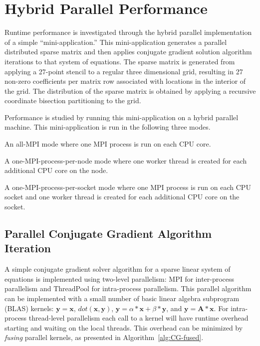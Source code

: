 \section{Hybrid Parallel Performance}

Runtime performance is investigated through the hybrid parallel implementation of a simple ``mini-application.''
%
This mini-application generates a parallel distributed sparse matrix and then applies conjugate gradient solution algorithm iterations to that system of equations.
%
The sparse matrix is generated from applying a 27-point stencil to a regular three dimensional grid, resulting in 27 non-zero coefficients per matrix row associated with locations in the interior of the grid.
%
The distribution of the sparse matrix is obtained by applying a recursive coordinate bisection \cite{RCB:1989} partitioning to the grid.


Performance is studied by running this mini-application on a hybrid parallel machine.
%
This mini-application is run in the following three modes.
\begin{blist}
\item An all-MPI mode where one MPI process is run on each CPU core.
\item A one-MPI-process-per-node mode where one worker thread is created for each additional CPU core on the node.
\item A one-MPI-process-per-socket mode where one MPI process is run on each CPU socket and one worker thread is created for each additional CPU core on the socket.
\end{blist}


\clearpage
\subsection{Parallel Conjugate Gradient Algorithm Iteration}

A simple conjugate gradient solver algorithm for a sparse linear system of equations is implemented using two-level parallelism: MPI for inter-process parallelism and ThreadPool for intra-process parallelism.
%
This parallel algorithm can be implemented with a small number of basic linear algebra subprogram (BLAS) kernels:
$\mathbf{y}=\mathbf{x}$,
$dot(\mathbf{x},\mathbf{y})$,
$\mathbf{y}=\alpha*\mathbf{x}+\beta*\mathbf{y}$, and
$\mathbf{y}=\mathbf{A}*\mathbf{x}$.
%
For intra-process thread-level parallelism each call to a kernel will have runtime overhead starting and waiting on the local threads.
%
This overhead can be minimized by \emph{fusing} parallel kernels, as presented in Algorithm~\ref{alg:CG-fused}.


